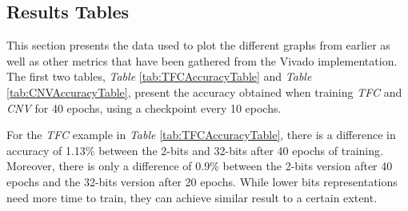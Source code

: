 \newpage
\subsection{Results Tables}

This section presents the data used to plot the different graphs from earlier as well as other metrics that have been gathered from the Vivado implementation. The first two tables, \emph{Table} \ref{tab:TFCAccuracyTable} and \emph{Table} \ref{tab:CNVAccuracyTable}, present the accuracy obtained when training \emph{TFC} and \emph{CNV} for 40 epochs, using a checkpoint every 10 epochs.

\begin{table}[!htb]
  \centering
\caption[TFC Accuracy Table]{TFC accuracy for different training times}
\label{tab:TFCAccuracyTable}
\end{table}

For the \emph{TFC} example in \emph{Table} \ref{tab:TFCAccuracyTable}, there is a difference in accuracy of 1.13\% between the 2-bits and 32-bits after 40 epochs of training. Moreover, there is only a difference of 0.9\% between the 2-bits version after 40 epochs and the 32-bits version after 20 epochs. While lower bits representations need more time to train, they can achieve similar result to a certain extent.

